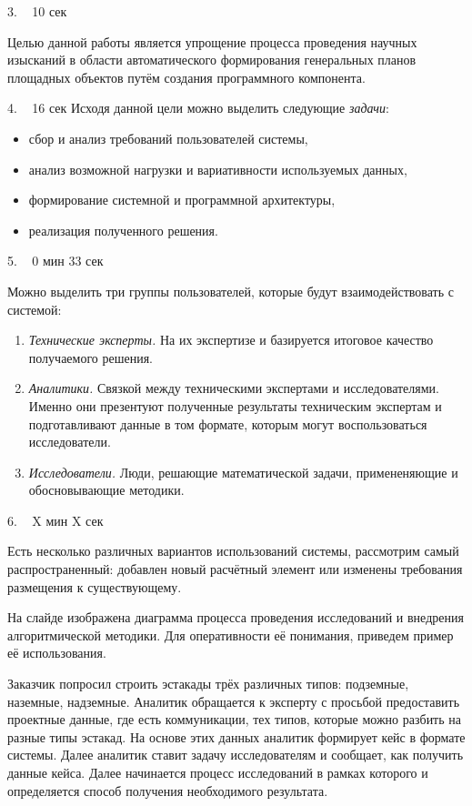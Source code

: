 \documentclass[11pt]{article}
\begin{document}
    3. ~ 10 сек

    Целью данной работы является
    упрощение процесса проведения научных изысканий
    в области автоматического формирования генеральных планов площадных объектов
    путём создания программного компонента.

    4. ~ 16 сек
    Исходя данной цели можно выделить следующие \textit{задачи}:
    \begin{itemize}
        \item сбор и анализ требований пользователей системы,
        \item анализ возможной нагрузки и вариативности используемых данных,
        \item формирование системной и программной архитектуры,
        \item реализация полученного решения.
    \end{itemize}

    5. ~ 0 мин 33 сек

    Можно выделить три группы пользователей, которые будут взаимодействовать с системой:
    \begin{enumerate}
        \item {
            \textit{Технические эксперты.} На их экспертизе и базируется итоговое
            качество получаемого решения.
        }
        \item{
            \textit{Аналитики.} Связкой между техническими экспертами и исследователями.
            Именно они презентуют полученные результаты техническим экспертам и подготавливают данные в том формате,
            которым могут воспользоваться исследователи.
        }
        \item{
            \textit{Исследователи.} Люди, решающие математической задачи,
            примененяющие и обосновывающие методики.
        }
    \end{enumerate}

    6. ~ X мин X сек

    Есть несколько различных вариантов использований системы, рассмотрим самый распространенный:
    добавлен новый расчётный элемент или изменены требования размещения к существующему.

    На слайде изображена диаграмма процесса проведения исследований и
    внедрения алгоритмической методики. Для оперативности её понимания,
    приведем пример её использования.

    Заказчик попросил строить эстакады трёх различных типов: подземные, наземные, надземные.
    Аналитик обращается к эксперту с просьбой предоставить проектные данные, где есть коммуникации,
    тех типов, которые можно разбить на разные типы эстакад.
    На основе этих данных аналитик формирует кейс в формате системы.
    Далее аналитик ставит задачу исследователям и сообщает, как получить данные кейса.
    Далее начинается процесс исследований в рамках которого и определяется способ получения необходимого результата.
\end{document}

